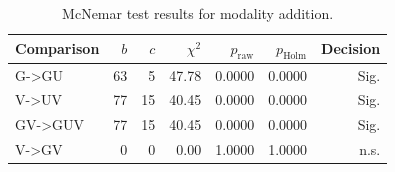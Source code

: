\begin{table}[htbp]
\centering
\caption{McNemar test results for modality addition.}
\label{tab:significance}
\begin{tabular}{@{}lrrrrrr@{}}
\toprule
Comparison & $b$ & $c$ & $\chi^2$ & $p_\text{raw}$ & $p_\text{Holm}$ & Decision \\
\midrule
G->GU & 63 & 5 & 47.78 & 0.0000 & 0.0000 & Sig. \\
V->UV & 77 & 15 & 40.45 & 0.0000 & 0.0000 & Sig. \\
GV->GUV & 77 & 15 & 40.45 & 0.0000 & 0.0000 & Sig. \\
V->GV & 0 & 0 & 0.00 & 1.0000 & 1.0000 & n.s. \\
\bottomrule
\end{tabular}
\end{table}
